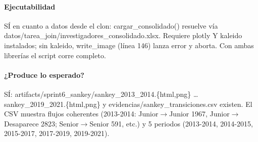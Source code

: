 \paragraph{Ejecutabilidad}
SÍ en cuanto a datos desde el clon: cargar\_consolidado() resuelve vía datos/tarea\_join/investigadores\_consolidado.xlsx. Requiere plotly Y kaleido instalados; sin kaleido, write\_image (línea 146) lanza error y aborta. Con ambas librerías el script corre completo.

\paragraph{¿Produce lo esperado?}
SÍ: artifacts/sprint6\_sankey/sankey\_2013\_2014.\{html,png\} \dots{} sankey\_2019\_2021.\{html,png\} y evidencias/sankey\_transiciones.csv existen. El CSV muestra flujos coherentes (2013-2014: Junior$\rightarrow$Junior 1967, Junior$\rightarrow$Desaparece 2823; Senior$\rightarrow$Senior 591, etc.) y 5 periodos (2013-2014, 2014-2015, 2015-2017, 2017-2019, 2019-2021).

